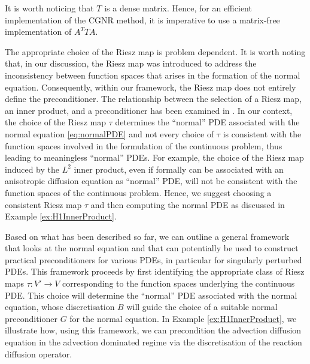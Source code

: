 \documentclass[hidelinks,onefignum,onetabnum]{siamart220329}
\begin{document}
\begin{remark}
    It is worth noticing that $T$ is a dense matrix. Hence, for an efficient implementation of the CGNR method, it is imperative to use a matrix-free implementation of $A^TTA$.
\end{remark}
\begin{remark}
    \label{eq:remarkRiesz}
    The appropriate choice of the Riesz map is problem dependent. It is worth noting that, in our discussion, the Riesz map was introduced to address the inconsistency between function spaces that arises in the formation of the normal equation. Consequently, within our framework, the Riesz map does not entirely define the preconditioner. The relationship between the selection of a Riesz map, an inner product, and a preconditioner has been examined in \cite{gunnel2014note}.
    In our context, the choice of the Riesz map $\tau$ determines the ``normal'' PDE associated with the normal equation \eqref{eq:normalPDE} and not every choice of $\tau$ is consistent with the function spaces involved in the formulation of the continuous problem, thus leading to meaningless ``normal'' PDEs.
    For example, the choice of the Riesz map induced by the $L^2$ inner product, even if formally can be associated with an anisotropic diffusion equation as ``normal'' PDE, will not be consistent with the function spaces of the continuous problem.
    Hence, we suggest choosing a consistent Riesz map $\tau$ and then computing the normal PDE as discussed in Example \ref{ex:H1InnerProduct}.
\end{remark}

Based on what has been described so far, we can outline a general framework that looks at the normal equation and that can potentially be used to construct practical preconditioners for various PDEs, in particular for singularly perturbed PDEs.
This framework proceeds by first identifying the appropriate class of Riesz maps $\tau:V' \to V$ corresponding to the function spaces underlying the continuous PDE.
This choice will determine the ``normal'' PDE associated with the normal equation, whose discretisation $B$ will guide the choice of a suitable normal preconditioner $G$ for the normal equation.
In Example \ref{ex:H1InnerProduct}, we illustrate how, using this framework, we can precondition the advection diffusion equation in the advection dominated regime via the discretisation of the reaction diffusion operator.
\end{document}
